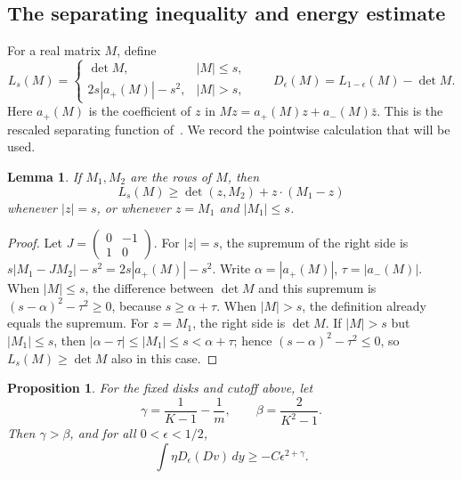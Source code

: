 \documentclass[11pt]{article}
\newtheorem{proposition}{Proposition}[section]
\newtheorem{lemma}{Lemma}[section]
\theoremstyle{remark}
\numberwithin{equation}{section}
\begin{document}
\subsection{The separating inequality and energy estimate}

For a real matrix \(M\), define
\begin{equation}\label{eq:Ls}
L_s(M)=
\begin{cases}
\det M,& |M|\le s,\\
2s|a_+(M)|-s^2,& |M|>s,
\end{cases}
\qquad D_\epsilon(M)=L_{1-\epsilon}(M)-\det M.
\end{equation}
Here \(a_+(M)\) is the coefficient of \(z\) in
\(Mz=a_+(M)z+a_-(M)\bar z\).
This is the rescaled separating function of~\cite[Lemma~3]{Agazzi}.
We record the pointwise calculation that will be used.

\begin{lemma}\label{lem:calibration}
If \(M_1,M_2\) are the rows of \(M\), then
\[
L_s(M)\ge \det(z,M_2)+z\cdot(M_1-z)
\]
whenever \(|z|=s\), or whenever \(z=M_1\) and \(|M_1|\le s\).
\end{lemma}

\begin{proof}
Let \(J=\left(\begin{smallmatrix}0&-1\\1&0\end{smallmatrix}\right)\).
For \(|z|=s\), the supremum of the right side is
\(s|M_1-JM_2|-s^2=2s|a_+(M)|-s^2\).
Write \(\alpha=|a_+(M)|\), \(\tau=|a_-(M)|\).
When \(|M|\le s\), the difference between \(\det M\) and this supremum is
\((s-\alpha)^2-\tau^2\ge0\), because \(s\ge\alpha+\tau\).
When \(|M|>s\), the definition already equals the supremum.
For \(z=M_1\), the right side is \(\det M\).
If \(|M|>s\) but \(|M_1|\le s\), then
\(|\alpha-\tau|\le|M_1|\le s<\alpha+\tau\);
hence \((s-\alpha)^2-\tau^2\le0\), so \(L_s(M)\ge\det M\)
also in this case.
\end{proof}

\begin{proposition}\label{prop:defect}
For the fixed disks and cutoff above, let
\[
\gamma=\frac1{K-1}-\frac1m,\qquad
\beta=\frac2{K^2-1}.
\]
Then \(\gamma>\beta\), and for all \(0<\epsilon<1/2\),
\begin{equation}\label{eq:defect}
\int\eta D_\epsilon(Dv)\,dy\ge-C\epsilon^{2+\gamma}.
\end{equation}
\end{proposition}
\end{document}

